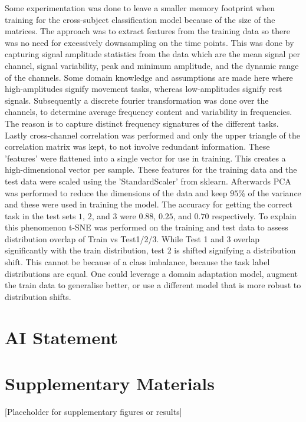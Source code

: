 \documentclass[conference]{IEEEtran}
\begin{document}
Some experimentation was done to leave a smaller memory footprint when training for the cross-subject classification model because of the size of the matrices. The approach was to extract features from the training data so there was no need for excessively downsampling on the time points. This was done by capturing signal amplitude statistics from the data which are the mean signal per channel, signal variability, peak and minimum amplitude, and the dynamic range of the channels. Some domain knowledge and assumptions are made here where high-amplitudes signify movement tasks, whereas low-amplitudes signify rest signals. Subsequently a discrete fourier transformation was done over the channels, to determine average frequency content and variability in frequencies. The reason is to capture distinct frequency signatures of the different tasks. Lastly cross-channel correlation was performed and only the upper triangle of the correlation matrix was kept, to not involve redundant information. These 'features' were flattened into a single vector for use in training. This creates a high-dimensional vector per sample. These features for the training data and the test data were scaled using the 'StandardScaler' from sklearn. Afterwards PCA was performed to reduce the dimensions of the data and keep $95\%$ of the variance and these were used in training the model. The accuracy for getting the correct task in the test sets $1$, $2$, and $3$ were $0.88$, $0.25$, and $0.70$ respectively. To explain this phenomenon t-SNE was performed on the training and test data to assess distribution overlap of Train vs Test1/2/3. While Test 1 and 3 overlap significantly with the train distribution, test 2 is shifted signifying a distribution shift. This cannot be because of a class imbalance, because the task label distributions are equal. One could leverage a domain adaptation model, augment the train data to generalise better, or use a different model that is more robust to distribution shifts.


\section*{AI Statement}




\section*{Supplementary Materials}
[Placeholder for supplementary figures or results]

\clearpage
\onecolumn
\end{document}
